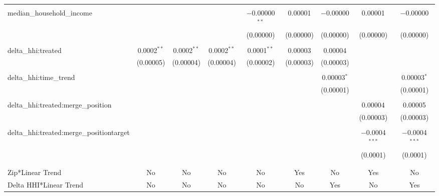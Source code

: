 \begin{table}[H]
{\begin{tabular}{@{\extracolsep{5pt}}lcccccccc}
   & & & & & & & & \\  

  median\_household\_income &  &  &  & $-$0.00000$^{**}$ & 0.00001 & $-$0.00000 & 0.00001 & $-$0.00000 \\  

   &  &  &  & (0.00000) & (0.00000) & (0.00000) & (0.00000) & (0.00000) \\  

   & & & & & & & & \\  

  delta\_hhi:treated & 0.0002$^{**}$ & 0.0002$^{**}$ & 0.0002$^{**}$ & 0.0001$^{**}$ & 0.00003 & 0.00004 &  &  \\  

   & (0.00005) & (0.00004) & (0.00004) & (0.00002) & (0.00003) & (0.00003) &  &  \\  

   & & & & & & & & \\  

  delta\_hhi:time\_trend &  &  &  &  &  & 0.00003$^{*}$ &  & 0.00003$^{*}$ \\  

   &  &  &  &  &  & (0.00001) &  & (0.00001) \\  

   & & & & & & & & \\  

  delta\_hhi:treated:merge\_position &  &  &  &  &  &  & 0.00004 & 0.00005 \\  

   &  &  &  &  &  &  & (0.00003) & (0.00003) \\  

   & & & & & & & & \\  

  delta\_hhi:treated:merge\_positiontarget &  &  &  &  &  &  & $-$0.0004$^{***}$ & $-$0.0004$^{***}$ \\  

   &  &  &  &  &  &  & (0.0001) & (0.0001) \\  

   & & & & & & & & \\  

 \hline \\[-1.8ex]  

 Zip*Linear Trend & No & No & No & No & Yes & No & Yes & No \\  

 Delta HHI*Linear Trend & No & No & No & No & No & Yes & No & Yes \\  


\end{tabular}}
\end{table}
